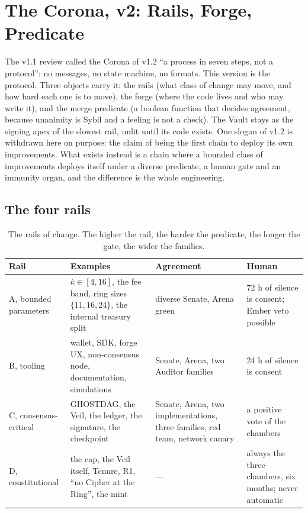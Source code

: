 
\section{The Corona, v2: Rails, Forge, Predicate}\label{sec:corona}

The v1.1 review called the Corona of v1.2 ``a process in seven
steps, not a protocol'': no messages, no state machine, no
formats. This version is the protocol. Three objects carry it:
the rails (what class of change may move, and how hard each one
is to move), the forge (where the code lives and who may write
it), and the merge predicate (a boolean function that decides
agreement, because unanimity is Sybil and a feeling is not a
check). The Vault stays as the signing apex of the slowest rail,
unlit until its code exists. One slogan of v1.2 is withdrawn
here on purpose: the claim of being the first chain to deploy its
own improvements. What exists instead is a chain where a bounded
class of
improvements deploys itself under a diverse predicate, a human
gate and an immunity organ, and the difference is the whole
engineering.

\subsection{The four rails}

\begin{table}[htbp]
\centering
\small
\caption{The rails of change. The higher the rail, the harder the
predicate, the longer the gate, the wider the families.}
\label{tab:rails}
\begin{tabularx}{\textwidth}{@{}L{2.8cm}YL{3.6cm}L{3.4cm}@{}}
\toprule
Rail & Examples & Agreement & Human \\
\midrule
A, bounded parameters & $k \in [4,16]$, the fee band, ring sizes $\{11,16,24\}$, the internal treasury split & diverse Senate, Arena green & 72 h of silence is consent; Ember veto possible \\
B, tooling & wallet, SDK, forge UX, non-consensus node, documentation, simulations & Senate, Arena, two Auditor families & 24 h of silence is consent \\
C, consensus-critical & GHOSTDAG, the Veil, the ledger, the signature, the checkpoint & Senate, Arena, two implementations, three families, red team, network canary & a positive vote of the chambers \\
D, constitutional & the cap, the Veil itself, Tenure, R1, ``no Cipher at the Ring'', the mint & --- & always the three chambers, six months; never automatic \\
\bottomrule
\end{tabularx}
\end{table}


